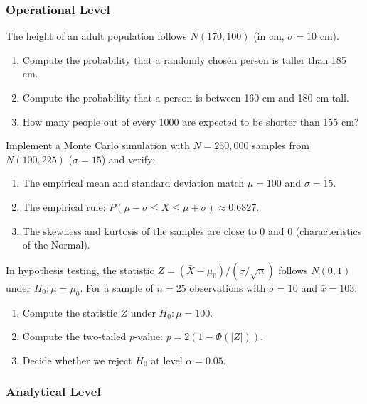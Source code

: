 \subsubsection*{Operational Level}

\begin{problema}
	\label{prob:4.6.4}
	The height of an adult population follows $N(170, 100)$ (in cm, $\sigma = 10$ cm).
	\begin{enumerate}
		\item Compute the probability that a randomly chosen person is taller than 185 cm.
		\item Compute the probability that a person is between 160 cm and 180 cm tall.
		\item How many people out of every 1000 are expected to be shorter than 155 cm?
	\end{enumerate}
\end{problema}

\begin{problema}
	\label{prob:4.6.5}
	Implement a Monte Carlo simulation with $N = 250{,}000$ samples from $N(100, 225)$ ($\sigma = 15$) and verify:
	\begin{enumerate}
		\item The empirical mean and standard deviation match $\mu = 100$ and $\sigma = 15$.
		\item The empirical rule: $P(\mu - \sigma \le X \le \mu + \sigma) \approx 0.6827$.
		\item The skewness and kurtosis of the samples are close to 0 and 0 (characteristics of the Normal).
	\end{enumerate}
\end{problema}

\begin{problema}
	\label{prob:4.6.6}
	In hypothesis testing, the statistic $Z = (\bar{X} - \mu_{0})/(\sigma/\sqrt{n})$ follows $N(0, 1)$ under $H_{0}: \mu = \mu_{0}$. For a sample of $n = 25$ observations with $\sigma = 10$ and $\bar{x} = 103$:
	\begin{enumerate}
		\item Compute the statistic $Z$ under $H_{0}: \mu = 100$.
		\item Compute the two-tailed $p$-value: $p = 2(1 - \Phi(|Z|))$.
		\item Decide whether we reject $H_{0}$ at level $\alpha = 0.05$.
	\end{enumerate}
\end{problema}

\subsubsection*{Analytical Level}

